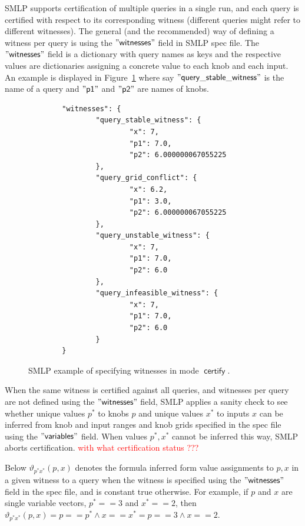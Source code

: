 \documentclass[a4paper,parskip=half]{article} %
\newcommand*\eqdef=
\newcommand*\mode[1]{\operatorname{\mathsf{#1}}} %
\newcommand*\speckey[1]{\operatorname{\mathsf{"{#1}"}}} %
\newcommand\todozk[1]{\textcolor{red}{#1}}
\newcommand*\ZK{\todozk}
\begin{document}
SMLP supports certification of multiple queries in a single run, and each query is certified with respect to its corresponding
witness (different queries might refer to different witnesses). The general (and the recommended) way of
defining a witness per query is using the $\speckey{witnesses}$ field in SMLP spec file. The  $\speckey{witnesses}$
field is a dictionary with query names as keys and the respective values are dictionaries assigning a concrete value to 
each knob and each input. An example is displayed in Figure~\ref{fig:certify:witnesses:spec} where say  
$\speckey{query\_stable\_witness}$ is the name of a query and $\speckey{p1}$ and $\speckey{p2}$ are names of knobs.

\begin{figure}[tp]%
\small
\begin{verbatim}
        "witnesses": {
                "query_stable_witness": {
                        "x": 7,
                        "p1": 7.0,
                        "p2": 6.000000067055225
                },
                "query_grid_conflict": {
                        "x": 6.2,
                        "p1": 3.0,
                        "p2": 6.000000067055225
                },
                "query_unstable_witness": {
                        "x": 7,
                        "p1": 7.0,
                        "p2": 6.0
                },
                "query_infeasible_witness": {
                        "x": 7,
                        "p1": 7.0,
                        "p2": 6.0
                }
        }
\end{verbatim}
\caption{SMLP example of specifying witnesses in mode $\mode{certify}$.}
\label{fig:certify:witnesses:spec}
\end{figure}


When the same witness is certified against all queries, and witnesses per query are not defined using the  $\speckey{witnesses}$ field,
SMLP applies a sanity check to see whether unique values $p^*$ to knobs $p$ and unique values $x^*$ to inputs $x$ can be inferred 
from knob and input ranges and knob grids specified in the spec file using the $\speckey{variables}$ field. 
When values $p^*, x^*$ cannot be inferred this way, SMLP aborts certification. \ZK{with what certification status ???}

Below $\vartheta_{p^*x^*}(p,x)$ denotes the formula inferred form value 
assignments to $p,x$ in a given witness to a query when the witness is specified using the
$\speckey{witnesses}$ field in the spec file, and is constant true otherwise. 
For example, if $p$ and $x$ are single variable vectors, $p^* == 3$ and $x^* == 2$, then 
$\vartheta_{p^*x^*}(p,x) \eqdef p == p^* \wedge x == x^* \eqdef p == 3 \wedge x == 2$.
\end{document}
